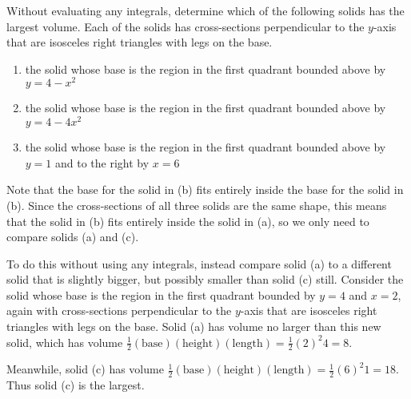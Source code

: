 \documentclass[handout]{ximera}
\begin{document}
\begin{problem}	
Without evaluating any integrals, determine which of the following solids has the largest volume. Each of the solids has cross-sections perpendicular to the $y$-axis that are isosceles right triangles with legs on the base.
\begin{enumerate}
	\item the solid whose base is the region in the first quadrant bounded above by $y = 4-x^2$
	\item the solid whose base is the region in the first quadrant bounded above by $y = 4-4x^2$
	\item the solid whose base is the region in the first quadrant bounded above by $y=1$ and to the right by $x=6$
\end{enumerate}
\begin{freeResponse}
Note that the base for the solid in (b) fits entirely inside the base for the solid in (b). Since the cross-sections of all three solids are the same shape, this means that the solid in (b) fits entirely inside the solid in (a), so we only need to compare solids (a) and (c). 

To do this without using any integrals, instead compare solid (a) to a different solid that is slightly bigger, but possibly smaller than solid (c) still. Consider the solid whose base is the region in the first quadrant bounded by $y=4$ and $x=2$, again with cross-sections perpendicular to the $y$-axis that are isosceles right triangles with legs on the base. Solid (a) has volume no larger than this new solid, which has volume $\frac12 (\text{base})(\text{height})(\text{length}) = \frac12  (2)^2 4 = 8$.

Meanwhile, solid (c) has volume $\frac12 (\text{base})(\text{height})(\text{length}) = \frac12 (6)^2 1 = 18$. Thus solid (c) is the largest.
\end{freeResponse}
\end{problem}
\end{document}
